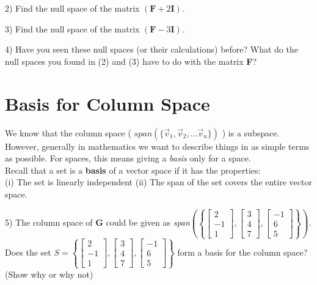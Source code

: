 \documentclass{article}
\begin{document}
\begin{flushleft}
2) Find the null space of the matrix $(\textbf{F} + 2 \textbf{I} )$. 

\vspace{1.25in}

3) Find the null space of the matrix $(\textbf{F} - 3 \textbf{I} )$. 

\vspace{1.25in}

4) Have you seen these null spaces (or their calculations) before? What do the null spaces you found in (2) and (3) have to do with the matrix \textbf{F}?

\vspace{1in}

\section*{Basis for Column Space}
We know that the column space ( $span( \{ \vec{v}_1 , \vec{v}_2, \ldots \vec{v}_n \} )$ ) is a subspace. However, generally in mathematics we want to describe things in as simple terms as possible. For spaces, this means giving a \textit{basis} only for a space. \\
Recall that a set is a \textbf{basis} of a vector space if it has the properties:\\
(i) The set is linearly independent \hspace{.25in} (ii) The span of the set covers the entire vector space.\\

\vspace{0.1in}

5) The column space of \textbf{G} could be given as \textit{span}$ \left( \left\{ \begin{bmatrix} 2 \\ -1 \\ 1\end{bmatrix}, \begin{bmatrix} 3 \\ 4 \\ 7 \end{bmatrix}, \begin{bmatrix} -1 \\ 6 \\ 5 \end{bmatrix} \right\} \right)$. Does the set $S=\left\{ \begin{bmatrix} 2 \\ -1 \\ 1 \end{bmatrix}, \begin{bmatrix} 3 \\ 4 \\ 7 \end{bmatrix}, \begin{bmatrix} -1 \\ 6 \\ 5 \end{bmatrix} \right\}$ form a basis for the column space? (Show why or why not)


\end{flushleft}
\end{document}

